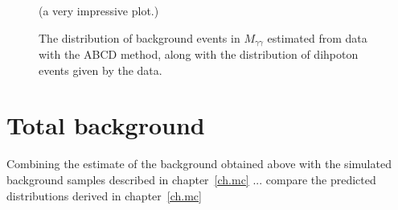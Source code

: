 \begin{figure}[htp]
\begin{minipage}[b]{.69\textwidth}
\hspace{-1em}%
\centering (a very impressive plot.)
\end{minipage}\hfill\begin{minipage}[b]{.3\textwidth}
\caption{The distribution of background events in $M_{\gamma\gamma}$ estimated from data with the ABCD method, along with the distribution of dihpoton events given by the data.
\label{mggbck}}
\end{minipage}
\end{figure}

\section{Total background}
Combining the estimate of the background obtained above with the simulated background samples described in chapter~\ref{ch.mc} ... compare the predicted distributions derived in chapter~\ref{ch.mc}
